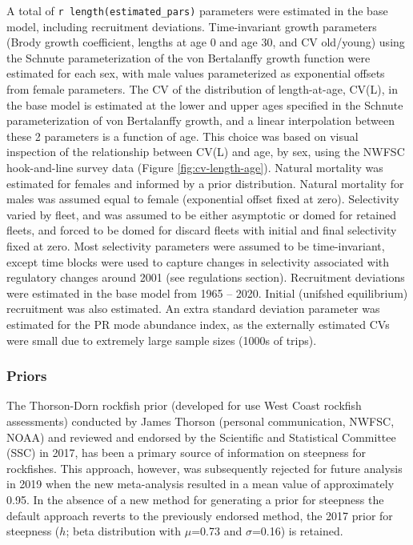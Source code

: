 \documentclass[
  english,
  a4paper,
]{article}
\begin{document}
A total of \texttt{r\ length(estimated\_pars)} parameters were estimated in the base model, including recruitment deviations. Time-invariant growth parameters (Brody growth coefficient, lengths at age 0 and age 30, and CV old/young) using the Schnute parameterization of the von Bertalanffy growth function were estimated for each sex, with male values parameterized as exponential offsets from female parameters. The CV of the distribution of length-at-age, CV(L), in the base model is estimated at the lower and upper ages specified in the Schnute parameterization of von Bertalanffy growth, and a linear interpolation between these 2 parameters is a function of age. This choice was based on visual inspection of the relationship between CV(L) and age, by sex, using the NWFSC hook-and-line survey data (Figure \ref{fig:cv-length-age}). Natural mortality was estimated for females and informed by a prior distribution. Natural mortality for males was assumed equal to female (exponential offset fixed at zero). Selectivity varied by fleet, and was assumed to be either asymptotic or domed for retained fleets, and forced to be domed for discard fleets with initial and final selectivity fixed at zero. Most selectivity parameters were assumed to be time-invariant, except time blocks were used to capture changes in selectivity associated with regulatory changes around 2001 (see regulations section). Recruitment deviations were estimated in the base model from 1965 -- 2020. Initial (unifshed equilibrium) recruitment was also estimated. An extra standard deviation parameter was estimated for the PR mode abundance index, as the externally estimated CVs were small due to extremely large sample sizes (1000s of trips).

\hypertarget{priors}{%
\subsubsection{Priors}\label{priors}}

The Thorson-Dorn rockfish prior (developed for use West Coast rockfish assessments) conducted by James Thorson (personal communication, NWFSC, NOAA) and reviewed and endorsed by the Scientific and Statistical Committee (SSC) in 2017, has been a primary source of information on steepness for rockfishes. This approach, however, was subsequently rejected for future analysis in 2019 when the new meta-analysis resulted in a mean value of approximately 0.95. In the absence of a new method for generating a prior for steepness the default approach reverts to the previously endorsed method, the 2017 prior for steepness (\(h\); beta distribution with \(\mu\)=0.73 and \(\sigma\)=0.16) is retained.
\end{document}
